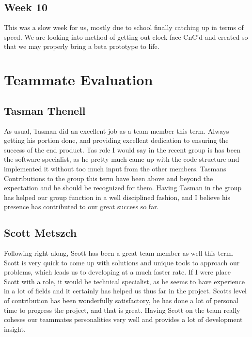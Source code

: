 \documentclass[onecolumn, draftclsnofoot,10pt, compsoc]{IEEEtran}
\begin{document}
\subsection{Week 10}
This was a slow week for us, mostly due to school finally catching up in terms of speed.
We are looking into method of getting out clock face CnC'd and created so that we may properly bring a beta prototype to life.

\section{Teammate Evaluation}

\subsection{Tasman Thenell}
As usual, Tasman did an excellent job as a team member this term.
Always getting his portion done, and providing excellent dedication to ensuring the success of the end product.
Tas role I would say in the recent group is has been the software specialist, as he pretty much came up with the code structure and implemented it without too much input from the other members.
Tasmans Contributions to the group this term have been above and beyond the expectation and he should be recognized for them.
Having Tasman in the group has helped our group function in a well disciplined fashion, and I believe his presence has contributed to our great success so far.

\subsection{Scott Metszch}
Following right along, Scott has been a great team member as well this term.
Scott is very quick to come up with solutions and unique tools to approach our problems, which leads us to developing at a much faster rate.
If I were place Scott with a role, it would be technical specialist, as he seems to have experience in a lot of fields and it certainly has helped us thus far in the project.
Scotts level of contribution has been wonderfully satisfactory, he has done a lot of personal time to progress the project, and that is great.
Having Scott on the team really coheses our teammates personalities very well and provides a lot of development insight.
\end{document}
